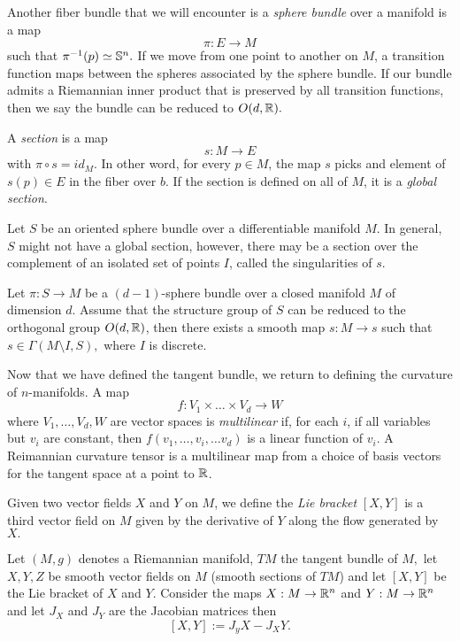 Another fiber bundle that we will encounter is a \emph{sphere bundle} 
over a manifold is a map
$$\pi:E\rightarrow M$$
such that $\pi^{-1}(p)\simeq \mathbb{S}^n.$ 
If we move from one point to another on $M$, a transition function
maps between the spheres associated by the sphere bundle.
If our bundle admits a Riemannian inner product that is preserved
by all transition functions, then we say the bundle can be reduced to $O(d,\mathbb{R}).$

A \emph{section}
is a map
$$s:M\rightarrow E$$
with $\pi \circ s = id_M.$ In other word, for every $p\in M$,
the map $s$ picks and element of $s(p)\in E$ in the fiber over $b$.
If the section is defined on all of $M$, it is a \emph{global section}.

Let $S$ be an oriented sphere bundle over a differentiable manifold $M$.
In general, $S$ might not have a global section, however, there may be a section over
the complement of an isolated set of points $I$, called the singularities of $s$.

\begin{theorem}[Singularities]
Let $\pi: S\rightarrow M$ be a $(d-1)$-sphere bundle over a closed manifold $M$ of dimension $d$.
Assume that the structure group of $S$ can be reduced to the orthogonal group $O(d,\mathbb{R})$, then there exists
a smooth map $s:M\rightarrow s$ such that $s\in \Gamma(M\setminus I, S),$ where $I$ is discrete.
\end{theorem}


Now that we have defined  the tangent bundle, we return to defining the
curvature of $n$-manifolds.
A map 
$$f:V_1\times \ldots \times V_d\rightarrow W$$ where $V_1,\ldots, V_d,W$ are vector spaces
is \emph{multilinear} if, for each $i$, if all variables but $v_i$ are constant, then $f(v_1,\ldots ,v_i,\ldots
v_d)$ is a linear function of $v_i.$
A Reimannian curvature tensor is a multilinear map from a choice of basis vectors for the tangent
space at a point to $\mathbb{R}$. 

Given two vector fields $X$ and $Y$ on $M$, we define the \emph{Lie bracket} $[X,Y]$
is a third vector field on $M$ given by the derivative of $Y$ along the flow generated by $X.$

Let $(M,g)$ denotes a Riemannian manifold, $TM$ the tangent bundle of $M,$
let $X,Y,Z$ be smooth vector fields on $M$ (smooth sections of $TM$)
and let $[X,Y]$ be the Lie bracket of $X$ and $Y.$
Consider the maps $X:M\rightarrow \mathbb{R}^n$ and $Y:M\rightarrow \mathbb{R}^n$ and let
$J_X$ and $J_Y$ are the Jacobian matrices then 
$$[X,Y]:=J_yX-J_XY.$$

